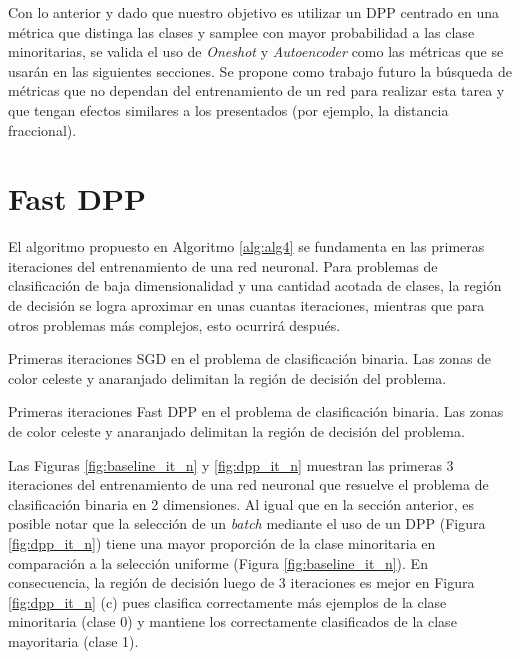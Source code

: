 \vspace{0.2cm}

Con lo anterior y dado que nuestro objetivo es utilizar un DPP centrado en una métrica que distinga las clases y samplee con mayor probabilidad a las clase minoritarias, se valida el uso de \textit{Oneshot} y \textit{Autoencoder} como las métricas que se usarán en las siguientes secciones. Se propone como trabajo futuro la búsqueda de métricas que no dependan del entrenamiento de un red para realizar esta tarea y que tengan efectos similares a los presentados (por ejemplo, la distancia fraccional).  

\section{Fast DPP}

El algoritmo propuesto en Algoritmo \ref{alg:alg4} se fundamenta en las primeras iteraciones del entrenamiento de una red neuronal. Para problemas de clasificación de baja dimensionalidad y una cantidad acotada de clases, la región de decisión se logra aproximar en unas cuantas iteraciones, mientras que para otros problemas más complejos, esto ocurrirá después. 

\begin{images}[\label{fig:baseline_it_n}]{\centering Primeras iteraciones SGD en el problema de clasificación binaria. Las zonas de color celeste y anaranjado delimitan la región de decisión del problema.}

\end{images}

\begin{images}[\label{fig:dpp_it_n}]{\centering Primeras iteraciones Fast DPP en el problema de clasificación binaria. Las zonas de color celeste y anaranjado delimitan la región de decisión del problema.}

\end{images}


Las Figuras \ref{fig:baseline_it_n} y \ref{fig:dpp_it_n} muestran las primeras 3 iteraciones del entrenamiento de una red neuronal que resuelve el problema de clasificación binaria en 2 dimensiones. Al igual que en la sección anterior, es posible notar que la selección de un \textit{batch} mediante el uso de un DPP (Figura \ref{fig:dpp_it_n}) tiene una mayor proporción de la clase minoritaria en comparación a la selección uniforme (Figura \ref{fig:baseline_it_n}). En consecuencia, la región de decisión luego de 3 iteraciones es mejor en Figura \ref{fig:dpp_it_n} (c) pues clasifica correctamente más ejemplos de la clase minoritaria (clase 0) y mantiene los correctamente clasificados de la clase mayoritaria (clase 1). 

